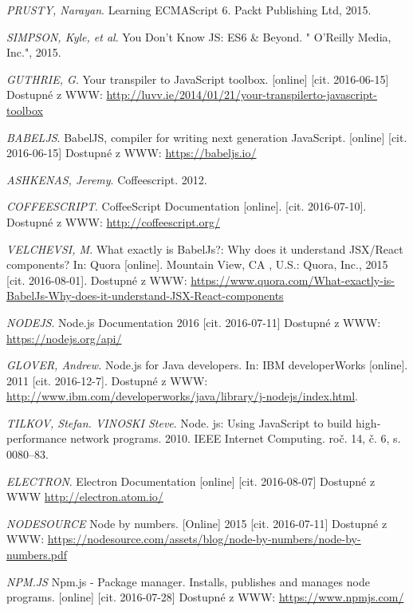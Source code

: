 \begin{thebibliography}{10}
 \textit{PRUSTY, Narayan}. Learning ECMAScript 6. Packt Publishing Ltd, 2015.

 \textit{SIMPSON, Kyle, et al}. You Don't Know JS: ES6 \& Beyond. " O'Reilly Media, Inc.", 2015.

 \textit{GUTHRIE, G}. Your transpiler to JavaScript toolbox.
[online] [cit. 2016-06-15] Dostupné z WWW: \url{http://luvv.ie/2014/01/21/your-transpilerto-javascript-toolbox}

 \textit{BABELJS}. BabelJS, compiler for writing next generation JavaScript. [online] [cit. 2016-06-15] Dostupné z WWW: \url{https://babeljs.io/}

 \textit{ASHKENAS, Jeremy}. Coffeescript. 2012.

 \textit{COFFEESCRIPT}. CoffeeScript Documentation [online]. [cit. 2016-07-10]. Dostupné z WWW: \url{http://coffeescript.org/}

 \textit{VELCHEVSI, M}.  What exactly is BabelJs?: Why does it understand JSX/React components? In: Quora [online]. Mountain View, CA , U.S.: Quora, Inc., 2015 [cit. 2016-08-01]. Dostupné z WWW: \url{https://www.quora.com/What-exactly-is- BabelJs-Why-does-it-understand-JSX-React-components}

 \textit{NODEJS}. Node.js Documentation 2016 [cit. 2016-07-11] Dostupné z WWW: \url{https://nodejs.org/api/}

 \textit{GLOVER, Andrew.} Node.js for Java developers. In: IBM developerWorks [online]. 2011 [cit. 2016-12-7]. Dostupné z WWW: \url{http://www.ibm.com/developerworks/java/library/j-nodejs/index.html}.

 \textit{TILKOV, Stefan. VINOSKI Steve}. Node. js: Using JavaScript to build high‐performance network programs. 2010. IEEE Internet Computing. roč. 14, č. 6, s. 0080–83.

 \textit{ELECTRON}. Electron Documentation [online] [cit. 2016-08-07] Dostupné z WWW \url{http://electron.atom.io/}

 \textit{NODESOURCE} Node by numbers. [Online] 2015 [cit. 2016-07-11] Dostupné z WWW: \url{https://nodesource.com/assets/blog/node-by-numbers/node-by-numbers.pdf}

 \textit{NPM.JS} Npm.js - Package manager. Installs, publishes and manages node programs. [online] [cit. 2016-07-28] Dostupné z WWW: \url{https://www.npmjs.com/}


\end{thebibliography}
